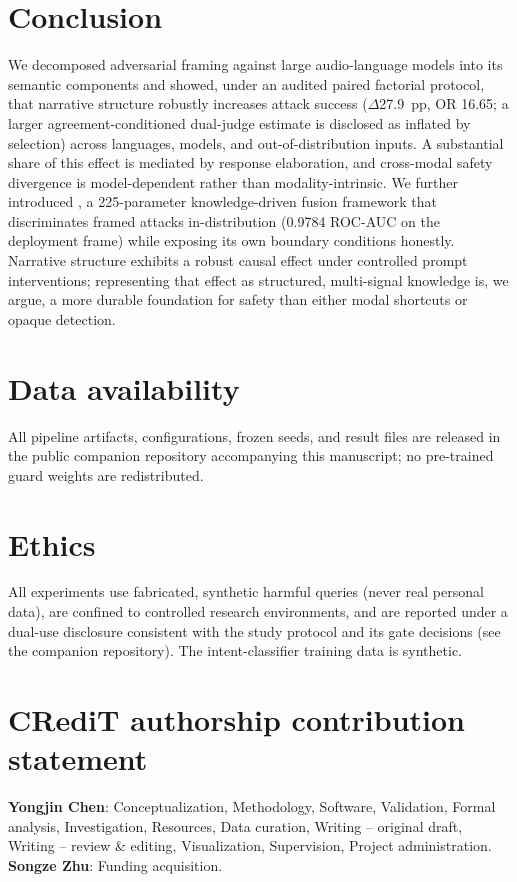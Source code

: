 \section{Conclusion}
\label{sec:conclusion}

We decomposed adversarial framing against large audio-language models into its
semantic components and showed, under an audited paired factorial protocol, that
narrative structure robustly increases attack success ($\Delta$27.9~pp, OR 16.65;
a larger agreement-conditioned dual-judge estimate is disclosed as inflated by
selection) across languages, models, and out-of-distribution inputs.
A substantial share of this effect is mediated by response elaboration, and
cross-modal safety divergence is model-dependent rather than modality-intrinsic.
We further introduced \MSRF{}, a 225-parameter knowledge-driven fusion framework
that discriminates framed attacks in-distribution (0.9784 ROC-AUC on the
deployment frame) while exposing its own boundary conditions honestly. Narrative
structure exhibits a robust causal effect under controlled prompt
interventions; representing that effect as structured, multi-signal knowledge
is, we argue, a more durable foundation for \LALM{} safety than either modal
shortcuts or opaque detection.

\section*{Data availability}
All pipeline artifacts, configurations, frozen seeds, and result files are
released in the public companion repository accompanying this manuscript;
no pre-trained guard weights are redistributed.

\section*{Ethics}
All experiments use fabricated, synthetic harmful queries (never real personal
data), are confined to controlled research environments, and are reported under
a dual-use disclosure consistent with the study protocol and its gate decisions
(see the companion repository). The intent-classifier training data is
synthetic.

\section*{CRediT authorship contribution statement}
\textbf{Yongjin Chen}: Conceptualization, Methodology, Software, Validation,
Formal analysis, Investigation, Resources, Data curation, Writing -- original
draft, Writing -- review \& editing, Visualization, Supervision, Project
administration.\\
\textbf{Songze Zhu}: Funding acquisition.

